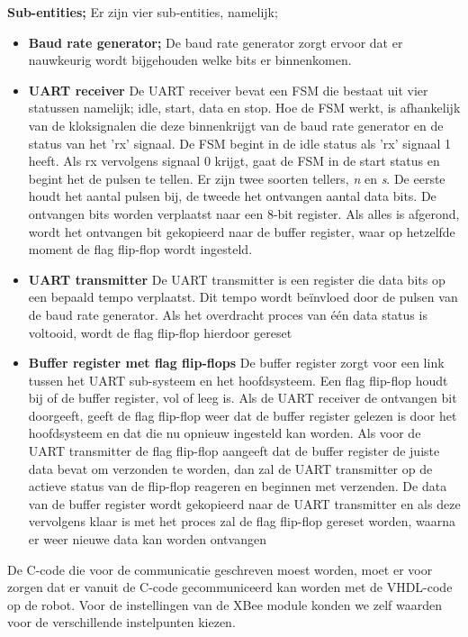 \documentclass{report}
\begin{document}
\textbf{Sub-entities;}
\newline
Er zijn vier sub-entities, namelijk;
\begin{itemize}
\item  \textbf{Baud rate generator;}
\newline
De baud rate generator zorgt ervoor dat er nauwkeurig wordt bijgehouden welke bits er binnenkomen.

\item \textbf{UART receiver}
\newline 
De UART receiver bevat een FSM die bestaat uit vier statussen namelijk; idle, start, data en stop.
Hoe de FSM werkt, is afhankelijk van de kloksignalen die deze binnenkrijgt van de baud rate generator en de status van het 'rx' signaal.
De FSM begint in de idle status als 'rx' signaal 1 heeft.
Als rx vervolgens signaal 0 krijgt, gaat de FSM in de start status en begint het de pulsen te tellen.
Er zijn twee soorten tellers, \textit{n} en \textit{s}.
De eerste houdt het aantal pulsen bij, de tweede het ontvangen aantal data bits.
De ontvangen bits worden verplaatst naar een 8-bit register.
Als alles is afgerond, wordt het ontvangen bit gekopieerd naar de buffer register, waar op hetzelfde moment de flag flip-flop wordt ingesteld.
 
 \item \textbf{UART transmitter}
 \newline
 De UART transmitter is een register die data bits op een bepaald tempo verplaatst.
Dit tempo wordt beïnvloed door de pulsen van de baud rate generator.
Als het overdracht proces van één data status is voltooid, wordt de flag flip-flop hierdoor gereset
 
 \item \textbf{Buffer register met flag flip-flops}
 \newline
 De buffer register zorgt voor een link tussen het UART sub-systeem en het hoofdsysteem.
Een flag flip-flop houdt bij of de buffer register, vol of leeg is.
\newline
Als de UART receiver de ontvangen bit doorgeeft, geeft de flag flip-flop weer dat de buffer register gelezen is door het hoofdsysteem en dat die nu opnieuw ingesteld kan worden.
\newline
Als voor de UART transmitter de flag flip-flop aangeeft dat de buffer register de juiste data bevat om verzonden te worden, dan zal de UART transmitter op de actieve status van de flip-flop reageren en beginnen met verzenden.
De data van de buffer register wordt gekopieerd naar de UART transmitter en als deze vervolgens klaar is met het proces zal de flag flip-flop gereset worden, waarna er weer nieuwe data kan worden ontvangen 
 
\end{itemize}
De C-code die voor de communicatie geschreven moest worden, moet er voor zorgen dat er vanuit de C-code gecommuniceerd kan worden met de VHDL-code op de robot.
\newline
Voor de instellingen van de XBee module konden we zelf waarden voor de verschillende instelpunten kiezen.
\end{document}
